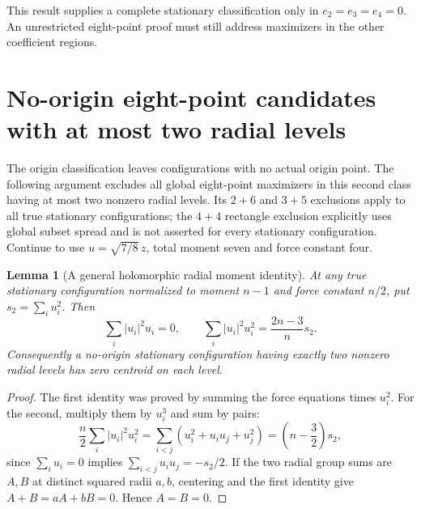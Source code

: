 \documentclass[11pt]{article}
\newtheorem{lemma}[theorem]{Lemma}
\theoremstyle{remark}
\numberwithin{equation}{section}
\begin{document}
This result supplies a complete stationary classification only in
$e_2=e_3=e_4=0$. An unrestricted eight-point proof must still address
maximizers in the other coefficient regions.

\section{No-origin eight-point candidates with at most two radial levels}
\label{sec:n8-noorigin-two-levels}

The origin classification leaves configurations with no actual origin
point. The following argument excludes all global eight-point
maximizers in this second class having at most two nonzero radial
levels. Its $2+6$ and $3+5$ exclusions apply to all true stationary
configurations; the $4+4$ rectangle exclusion explicitly uses global
subset spread and is not asserted for every stationary configuration.
Continue to use $u=\sqrt{7/8}\,z$, total moment seven and force
constant four.

\begin{lemma}[A general holomorphic radial moment identity]
\label{lem:holomorphic-radial-two}
At any true stationary configuration normalized to moment $n-1$
and force constant $n/2$, put $s_2=\sum_i u_i^2$. Then
\[
 \sum_i|u_i|^2u_i=0,\qquad
 \sum_i|u_i|^2u_i^2=\frac{2n-3}{n}s_2.
\]
Consequently a no-origin stationary configuration having exactly two
nonzero radial levels has zero centroid on each level.
\end{lemma}
\begin{proof}
The first identity was proved by summing the force equations times
$u_i^2$. For the second, multiply them by $u_i^3$ and sum by pairs:
\[
 \frac n2\sum_i|u_i|^2u_i^2
 =\sum_{i<j}(u_i^2+u_iu_j+u_j^2)
 =\left(n-\frac32\right)s_2,
\]
since $\sum_i u_i=0$ implies $\sum_{i<j}u_i u_j=-s_2/2$.
If the two radial group sums are $A,B$ at distinct squared radii
$a,b$, centering and the first identity give $A+B=aA+bB=0$.
Hence $A=B=0$.
\end{proof}
\end{document}
